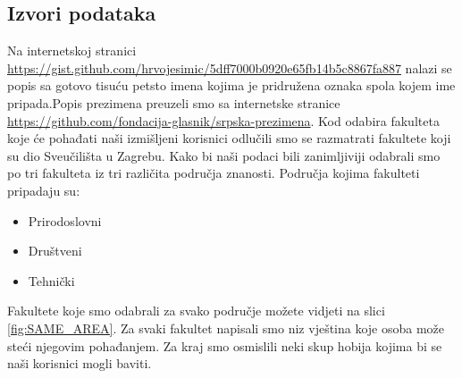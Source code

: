 \documentclass[titlepage, 12pt]{scrartcl}
\begin{document}
\subsection{Izvori podataka}
Na internetskoj stranici \url{https://gist.github.com/hrvojesimic/5dff7000b0920e65fb14b5c8867fa887} nalazi se popis sa gotovo tisuću petsto imena kojima je pridružena oznaka spola kojem ime pripada.Popis prezimena preuzeli smo sa internetske stranice \url{https://github.com/fondacija-glasnik/srpska-prezimena}.
Kod odabira fakulteta koje će pohađati naši izmišljeni korisnici odlučili smo se razmatrati fakultete koji su dio Sveučilišta u Zagrebu. Kako bi naši podaci bili zanimljiviji odabrali smo po tri fakulteta iz tri različita područja znanosti. Područja kojima fakulteti pripadaju su:
\begin{itemize}
    \item Prirodoslovni
    \item Društveni
    \item Tehnički
\end{itemize}
Fakultete koje smo odabrali za svako područje možete vidjeti na slici \ref{fig:SAME_AREA}.
Za svaki fakultet napisali smo niz vještina koje osoba može steći njegovim pohađanjem.
Za kraj smo osmislili neki skup hobija kojima bi se naši korisnici mogli baviti.
\end{document}
